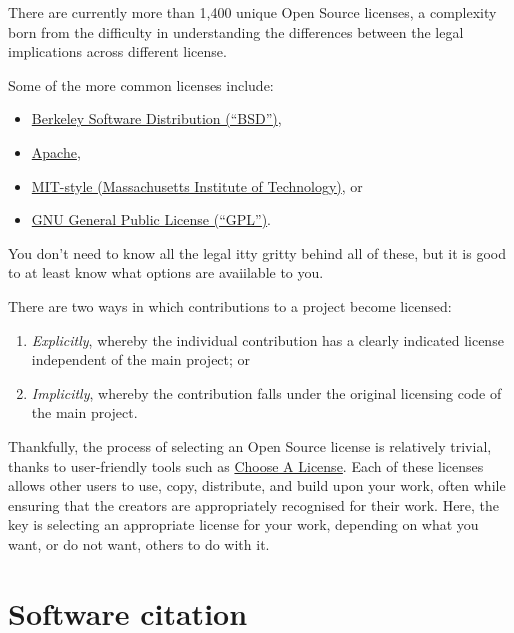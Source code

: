 \documentclass[]{book}
\providecommand{\tightlist}{%
  \setlength{\itemsep}{0pt}\setlength{\parskip}{0pt}}
\begin{document}
{{{{{{{{{{{{{{{{{{There are currently more than 1,400 unique Open Source licenses, a complexity born from the difficulty in understanding the differences between the legal implications across different license.

Some of the more common licenses include:

\begin{itemize}
\tightlist
\item
  \href{https://en.wikipedia.org/wiki/BSD_licenses}{Berkeley Software Distribution (``BSD'')},
\item
  \href{https://www.apache.org/licenses/LICENSE-2.0}{Apache},
\item
  \href{https://opensource.org/licenses/MIT}{MIT-style (Massachusetts Institute of Technology)}, or
\item
  \href{https://www.gnu.org/licenses/gpl-3.0.en.html}{GNU General Public License (``GPL'')}.
\end{itemize}

You don't need to know all the legal itty gritty behind all of these, but it is good to at least know what options are avaiilable to you.

There are two ways in which contributions to a project become licensed:

\begin{enumerate}
\def\labelenumi{\arabic{enumi}.}
\tightlist
\item
  \emph{Explicitly}, whereby the individual contribution has a clearly indicated license independent of the main project; or
\item
  \emph{Implicitly}, whereby the contribution falls under the original licensing code of the main project.
\end{enumerate}

Thankfully, the process of selecting an Open Source license is relatively trivial, thanks to user-friendly tools such as \href{https://choosealicense.com/}{Choose A License}. Each of these licenses allows other users to use, copy, distribute, and build upon your work, often while ensuring that the creators are appropriately recognised for their work. Here, the key is selecting an appropriate license for your work, depending on what you want, or do not want, others to do with it.

\hypertarget{software-citation}{%
\section{Software citation }\label{software-citation}}

}}}}}}}}}}}}}}}}}}
\end{document}
